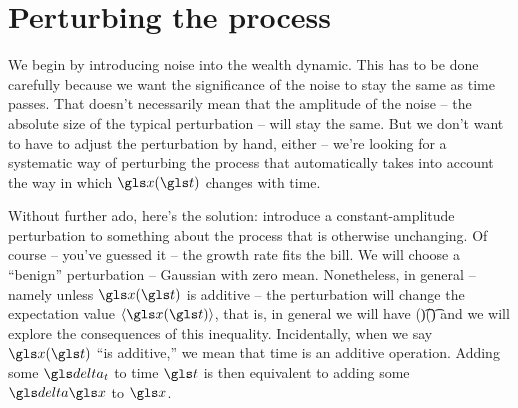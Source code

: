 \section{Perturbing the process }
%
%
%
%
%
%
%
%
%
%
%
%
%

We begin by introducing noise into the wealth dynamic. This has to be done carefully because we want the significance of the noise to stay the same as time passes. That doesn't necessarily mean that the amplitude of the noise -- the absolute size of the typical perturbation -- will stay the same. But we don't want to have to adjust the perturbation by hand, either -- we're looking for a systematic way of perturbing the process that automatically takes into account the way in which $\x(\t)$ changes with time. 


Without further ado, here's the solution: introduce a constant-amplitude perturbation to something about the process that is otherwise unchanging. Of course -- you've guessed it -- the growth rate fits the bill. We will choose a ``benign'' perturbation -- Gaussian with zero mean. Nonetheless, in general -- namely unless $\x(\t)$ is additive -- the perturbation will change the expectation value $\ave{\x(\t)}$, that is, in general we will have 
\be
\ave{\x}(\t)\neq \xd(\t)
\ee
and we will explore the consequences of this inequality. Incidentally, when we say $\x(\t)$ ``is additive,'' we mean that time is an additive operation. Adding some $\dt$ to time $\t$ is then equivalent to adding some $\d \x$ to $\x$.

